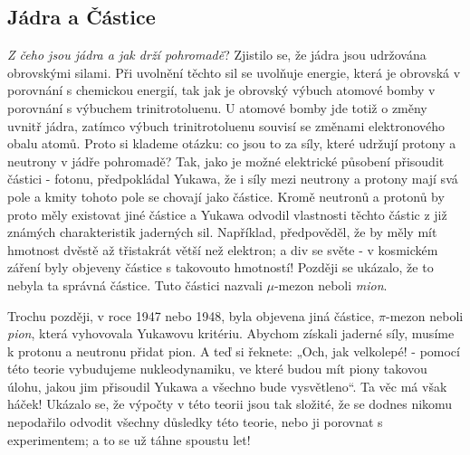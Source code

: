     \subsection{Jádra a Částice}\label{fyz:IchapIIsecVI}     
      \emph{Z čeho jsou jádra a jak drží pohromadě}? Zjistilo se, že jádra jsou udržována obrovskými
      silami. Při uvolnění těchto sil se uvolňuje energie, která je obrovská v porovnání s chemickou
      energií, tak jak je obrovský výbuch atomové bomby v porovnání s výbuchem trinitrotoluenu. U
      atomové bomby jde totiž o změny uvnitř jádra, zatímco výbuch trinitrotoluenu souvisí se
      změnami elektronového obalu atomů. Proto si klademe otázku: co jsou to za síly, které udržují
      protony a neutrony v jádře pohromadě? Tak, jako je možné elektrické působení přisoudit částici
      - fotonu, předpokládal Yukawa, že i síly mezi neutrony a protony mají svá pole a kmity tohoto
      pole se chovají jako částice. Kromě neutronů a protonů by proto měly existovat jiné částice a
      Yukawa odvodil vlastnosti těchto částic z již známých charakteristik jaderných sil. Například,
      předpověděl, že by měly mít hmotnost dvěstě až třistakrát větší než elektron; a div se světe -
      v kosmickém záření byly objeveny částice s takovouto hmotností! Později se ukázalo, že to
      nebyla ta správná částice. Tuto částici nazvali \(\mu\text{-mezon}\) neboli \emph{mion}.

      Trochu později, v roce 1947 nebo 1948, byla objevena jiná částice, \(\pi\text{-mezon}\) neboli
      \emph{pion}, která vyhovovala Yukawovu kritériu. Abychom získali jaderné síly, musíme k
      protonu a neutronu přidat pion. A teď si řeknete: „Och, jak velkolepé! - pomocí této teorie
      vybudujeme nukleodynamiku, ve které budou mít piony takovou úlohu, jakou jim přisoudil Yukawa
      a všechno bude vysvětleno“. Ta věc má však háček! Ukázalo se, že výpočty v této teorii jsou
      tak složité, že se dodnes nikomu nepodařilo odvodit všechny důsledky této teorie, nebo ji
      porovnat s experimentem; a to se už táhne spoustu let!
      
